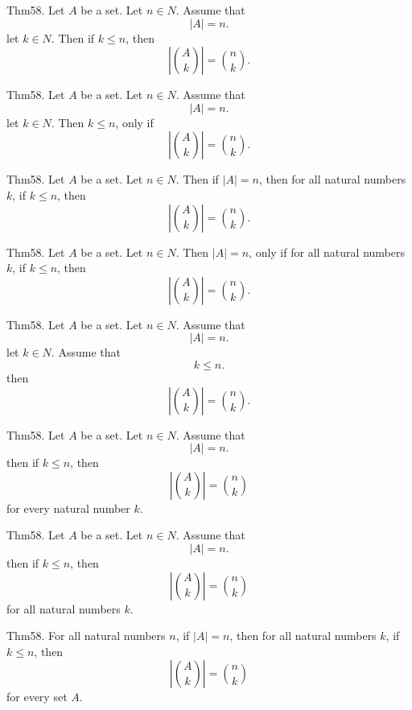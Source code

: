 \documentclass{article}
\begin{document}
Thm58. Let $A$ be a set. Let $n \in N$. Assume that $$| A | = n.$$ let $k \in N$. Then if $k \leq n$, then $$| \binom{ A }{ k}| = \binom{ n }{ k}.$$

Thm58. Let $A$ be a set. Let $n \in N$. Assume that $$| A | = n.$$ let $k \in N$. Then $k \leq n$, only if $$| \binom{ A }{ k}| = \binom{ n }{ k}.$$

Thm58. Let $A$ be a set. Let $n \in N$. Then if $| A | = n$, then for all natural numbers $k$, if $k \leq n$, then $$| \binom{ A }{ k}| = \binom{ n }{ k}.$$

Thm58. Let $A$ be a set. Let $n \in N$. Then $| A | = n$, only if for all natural numbers $k$, if $k \leq n$, then $$| \binom{ A }{ k}| = \binom{ n }{ k}.$$

Thm58. Let $A$ be a set. Let $n \in N$. Assume that $$| A | = n.$$ let $k \in N$. Assume that $$k \leq n.$$ then $$| \binom{ A }{ k}| = \binom{ n }{ k}.$$

Thm58. Let $A$ be a set. Let $n \in N$. Assume that $$| A | = n.$$ then if $k \leq n$, then $$| \binom{ A }{ k}| = \binom{ n }{ k}$$ for every natural number $k$.

Thm58. Let $A$ be a set. Let $n \in N$. Assume that $$| A | = n.$$ then if $k \leq n$, then $$| \binom{ A }{ k}| = \binom{ n }{ k}$$ for all natural numbers $k$.

Thm58. For all natural numbers $n$, if $| A | = n$, then for all natural numbers $k$, if $k \leq n$, then $$| \binom{ A }{ k}| = \binom{ n }{ k}$$ for every set $A$.
\end{document}
